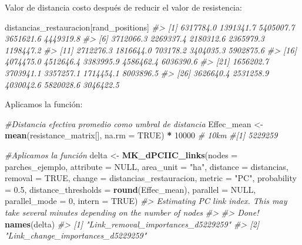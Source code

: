 \documentclass[
]{book}
\newenvironment{Shaded}{\begin{snugshade}}{\end{snugshade}}
\newcommand{\AttributeTok}[1]{\textcolor[rgb]{0.13,0.29,0.53}{#1}}
\newcommand{\CommentTok}[1]{\textcolor[rgb]{0.56,0.35,0.01}{\textit{#1}}}
\newcommand{\ConstantTok}[1]{\textcolor[rgb]{0.56,0.35,0.01}{#1}}
\newcommand{\DecValTok}[1]{\textcolor[rgb]{0.00,0.00,0.81}{#1}}
\newcommand{\FloatTok}[1]{\textcolor[rgb]{0.00,0.00,0.81}{#1}}
\newcommand{\FunctionTok}[1]{\textcolor[rgb]{0.13,0.29,0.53}{\textbf{#1}}}
\newcommand{\NormalTok}[1]{#1}
\newcommand{\OtherTok}[1]{\textcolor[rgb]{0.56,0.35,0.01}{#1}}
\newcommand{\SpecialCharTok}[1]{\textcolor[rgb]{0.81,0.36,0.00}{\textbf{#1}}}
\newcommand{\StringTok}[1]{\textcolor[rgb]{0.31,0.60,0.02}{#1}}
\begin{document}
Valor de distancia costo después de reducir el valor de resistencia:

\begin{Shaded}
\begin{Highlighting}[]
\NormalTok{distancias\_restauracion[rand\_positions]}
\CommentTok{\#\textgreater{}  [1] 6317784.0 1391341.7 5405007.7 3651621.6 4449319.8}
\CommentTok{\#\textgreater{}  [6] 3712066.3 2269337.4 2180312.6 2365979.3 1198447.2}
\CommentTok{\#\textgreater{} [11] 2712276.3 1816644.0  703178.2 3404035.3 5902875.6}
\CommentTok{\#\textgreater{} [16] 4074475.0 4512646.4 3383995.9 4586462.4 6036390.6}
\CommentTok{\#\textgreater{} [21] 1656202.7 3703941.1 3357257.1 1714454.1 8003896.5}
\CommentTok{\#\textgreater{} [26] 3626640.4 2531258.9 4030042.6 5820028.6 3046422.5}
\end{Highlighting}
\end{Shaded}

Aplicamos la función:

\begin{Shaded}
\begin{Highlighting}[]
\CommentTok{\#Distancia efectiva promedio como umbral de distancia}
\NormalTok{Effec\_mean }\OtherTok{\textless{}{-}} \FunctionTok{mean}\NormalTok{(resistance\_matrix[], }\AttributeTok{na.rm =} \ConstantTok{TRUE}\NormalTok{) }\SpecialCharTok{*} \DecValTok{10000} \CommentTok{\# 10km}
\CommentTok{\#[1] 5229259}

\CommentTok{\#Aplicamos la función}
\NormalTok{delta }\OtherTok{\textless{}{-}} \FunctionTok{MK\_dPCIIC\_links}\NormalTok{(}\AttributeTok{nodes =}\NormalTok{ parches\_ejemplo,}
                         \AttributeTok{attribute =} \ConstantTok{NULL}\NormalTok{,}
                         \AttributeTok{area\_unit =} \StringTok{"ha"}\NormalTok{,}
                         \AttributeTok{distance =}\NormalTok{ distancias,}
                         \AttributeTok{removal =} \ConstantTok{TRUE}\NormalTok{,}
                         \AttributeTok{change =}\NormalTok{ distancias\_restauracion,}
                         \AttributeTok{metric =} \StringTok{"PC"}\NormalTok{,}
                         \AttributeTok{probability =} \FloatTok{0.5}\NormalTok{,}
                         \AttributeTok{distance\_thresholds =} \FunctionTok{round}\NormalTok{(Effec\_mean),}
                         \AttributeTok{parallel =} \ConstantTok{NULL}\NormalTok{,}
                         \AttributeTok{parallel\_mode =} \DecValTok{0}\NormalTok{,}
                         \AttributeTok{intern =} \ConstantTok{TRUE}\NormalTok{)}
\CommentTok{\#\textgreater{} Estimating PC link index. This may take several minutes depending on the number of nodes}
\CommentTok{\#\textgreater{} }
\CommentTok{\#\textgreater{} Done!}
\FunctionTok{names}\NormalTok{(delta)}
\CommentTok{\#\textgreater{} [1] "Link\_removal\_importances\_d5229259"}
\CommentTok{\#\textgreater{} [2] "Link\_change\_importances\_d5229259"}
\end{Highlighting}
\end{Shaded}
\end{document}
